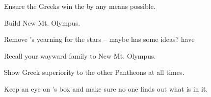 \documentclass[char]{guardians}
\begin{document}
\begin{itemz}[Goals]
  \item Ensure the Greeks win the \pGames{} by any means possible.
  \item Build New Mt. Olympus.
  \item Remove \cAthena{}'s yearning for the stars -- maybe \cUnity{} has some ideas? \cUnity{\They} have 
  \item Recall your wayward family to New Mt. Olympus.
  \item Show Greek superiority to the other Pantheons at all times.
  \item Keep an eye on \cPandora{}'s box and make sure no one finds out what is in it.
\end{itemz}


\begin{contacts}
  \contact{}
\end{contacts}
\end{document}
